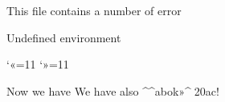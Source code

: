 \documentclass{article}
\begin{document}
This file contains a number of error
\begin{undefined-env}
Undefined environment
\end{undefined-env}

\catcode`^^ab=11 \catcode`^^bb=11

Now we have \fooa\foob\fooc\food\fooe %
We have also \^^abok^^bb\^^^^20ac!
\end{document}
